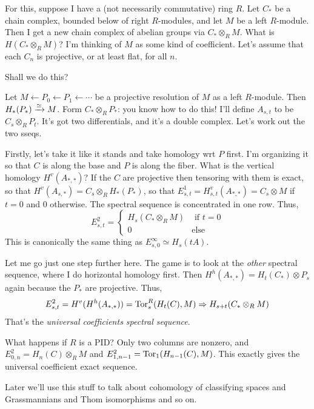 \begin{example}[UCT]
    For this, suppose I have a (not necessarily commutative) ring $R$.
    Let $C_\ast$ be a chain complex, bounded below of right $R$-modules, and let $M$ be a left $R$-module.
    Then I get a new chain complex of abelian groups via $C_\ast\otimes_R M$.
    What is $H(C_\ast\otimes_R M)$?
    I'm thinking of $M$ as some kind of coefficient.
    Let's assume that each $C_n$ is projective, or at least flat, for all $n$.

    Shall we do this?

    Let $M\leftarrow P_0 \leftarrow P_1\leftarrow \cdots$ be a projective resolution of $M$ as a left $R$-module.
    Then $H_\ast(P_\ast)\xrightarrow{{\simeq}} M$.
    Form $C_\ast\otimes_R P_\ast$: you know how to do this!
    I'll define $A_{s,t}$ to be $C_s\otimes_R P_t$.
    It's got two differentials, and it's a double complex.
    Let's work out the two sseqs.

    Firstly, let's take it like it stands and take homology wrt $P$ first.
    I'm organizing it so that $C$ is along the base and $P$ is along the fiber.
    What is the vertical homology $H^v(A_{\ast,\ast})$?
    If the $C$ are projective then tensoring with them is exact, so that $H^v(A_{s,\ast}) = C_s\otimes_R H_\ast(P_\ast)$, so that
    $E^1_{s,t} = H^v_{s,t}(A_{\ast,\ast}) = C_s\otimes M$ if $t=0$ and $0$ otherwise.
    The spectral sequence is concentrated in one row.
    Thus,
    $$E^2_{s,t} = \begin{cases}
	H_s(C_\ast\otimes_R M) & \text{ if }t = 0\\
	0 & \text{else}
    \end{cases}$$
    This is canonically the same thing as $E^\infty_{s,0}\simeq H_s(tA)$.

    Let me go just one step further here.
    The game is to look at the \emph{other} spectral sequence, where I do horizontal homology first.
    Then $H^h(A_{\ast,\ast}) = H_t(C_\ast)\otimes P_s$ again because the $P_\ast$ are projective.
    Thus,
    $$
    E^2_{s,t} = H^v(H^h(A_{\ast,\ast})) = \operatorname{Tor}^R_s(H_t(C),M)\Rightarrow H_{s+t}(C_\ast\otimes_R M)
    $$
    That's the \emph{universal coefficients spectral sequence}.

    What happens if $R$ is a PID?
    Only two columns are nonzero, and $E^2_{0,n} = H_n(C)\otimes_R M$ and $E^2_{1,n-1} = \operatorname{Tor}_1(H_{n-1}(C),M)$.
    This exactly gives the universal coefficient exact sequence.
\end{example}
Later we'll use this stuff to talk about cohomology of classifying spaces and Grassmannians and Thom isomorphisms and so on.

